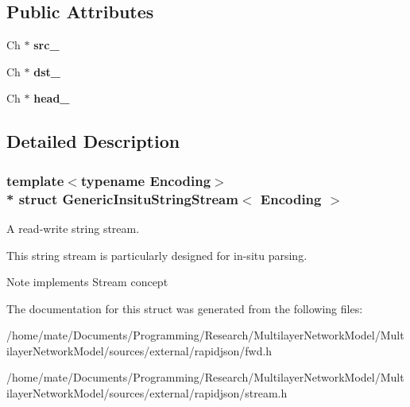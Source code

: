 \subsection*{Public Attributes}
\begin{DoxyCompactItemize}
\item 
Ch $\ast$ {\bfseries src\+\_\+}\hypertarget{structGenericInsituStringStream_af3cc551dd07fcca39db84459f4d4e718}{}\label{structGenericInsituStringStream_af3cc551dd07fcca39db84459f4d4e718}

\item 
Ch $\ast$ {\bfseries dst\+\_\+}\hypertarget{structGenericInsituStringStream_ab0e7a73638a7a8db81aa9b26714b0e3b}{}\label{structGenericInsituStringStream_ab0e7a73638a7a8db81aa9b26714b0e3b}

\item 
Ch $\ast$ {\bfseries head\+\_\+}\hypertarget{structGenericInsituStringStream_af5a7116bdd9bfde5141c298a5b7566b0}{}\label{structGenericInsituStringStream_af5a7116bdd9bfde5141c298a5b7566b0}

\end{DoxyCompactItemize}


\subsection{Detailed Description}
\subsubsection*{template$<$typename Encoding$>$\\*
struct Generic\+Insitu\+String\+Stream$<$ Encoding $>$}

A read-\/write string stream. 

This string stream is particularly designed for in-\/situ parsing. \begin{DoxyNote}{Note}
implements Stream concept 
\end{DoxyNote}


The documentation for this struct was generated from the following files\+:\begin{DoxyCompactItemize}
\item 
/home/mate/\+Documents/\+Programming/\+Research/\+Multilayer\+Network\+Model/\+Multilayer\+Network\+Model/sources/external/rapidjson/fwd.\+h\item 
/home/mate/\+Documents/\+Programming/\+Research/\+Multilayer\+Network\+Model/\+Multilayer\+Network\+Model/sources/external/rapidjson/stream.\+h\end{DoxyCompactItemize}
